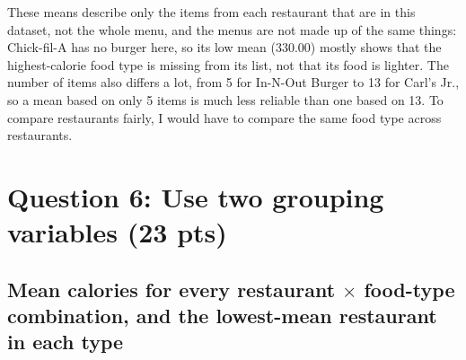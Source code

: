 \documentclass[11pt]{article}
\newcommand{\question}[2]{%
  \section*{\color{headblue}#1 \hfill \normalfont\small(#2)}}
\begin{document}
These means describe only the items from each restaurant that are in this dataset, not the
whole menu, and the menus are not made up of the same things: Chick-fil-A has no burger
here, so its low mean (330.00) mostly shows that the highest-calorie food type is missing
from its list, not that its food is lighter. The number of items also differs a lot, from 5 for In-N-Out Burger to
13 for Carl's Jr., so a mean based on only 5 items is much less reliable than one based on
13. To compare restaurants fairly, I would have to compare the same food type across
restaurants.

\clearpage
\question{Question 6: Use two grouping variables}{23 pts}

\subsection*{Mean calories for every restaurant $\times$ food-type combination, and the lowest-mean restaurant in each type}
\end{document}
